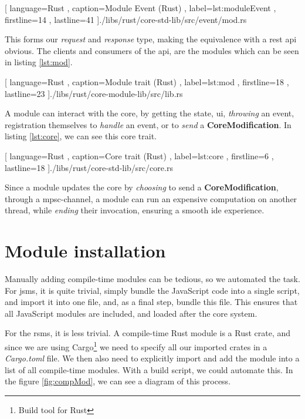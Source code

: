 \begin{center}
  
    [ language=Rust
    , caption={Module Event (Rust)}
    , label=lst:moduleEvent
    , firstline=14
    , lastline=41
    ]{./libs/rust/core-std-lib/src/event/mod.rs}
\end{center}

This forms our \textit{request} and \textit{response} type, making the
equivalence with a \gls*{rest} \gls*{api} obvious. The clients and consumers
of the \gls*{api}, are the modules which can be seen in listing \ref{lst:mod}.

\begin{center}
  
    [ language=Rust
    , caption={Module trait (Rust)}
    , label=lst:mod
    , firstline=18
    , lastline=23
    ]{./libs/rust/core-module-lib/src/lib.rs}
\end{center}

A module can interact with the core, by getting the state, \gls*{ui},
\textit{throwing} an event, registration themselves to \textit{handle} an
event, or to \textit{send} a \textbf{CoreModification}. In listing
\ref{lst:core}, we can see this core trait.

\begin{code}[H]
  
    [ language=Rust
    , caption={Core trait (Rust)}
    , label=lst:core
    , firstline=6
    , lastline=18
    ]{./libs/rust/core-std-lib/src/core.rs}
\end{code}

Since a module updates the core by \textit{choosing} to send a
\textbf{CoreModification}, through a \gls*{mpsc}-channel, a module can run an
expensive computation on another thread, while \textit{ending} their
invocation, ensuring a smooth \gls*{ide} experience.


\section{Module installation}

Manually adding compile-time modules can be tedious, so we automated the task.
For \gls*{jsms}, it is quite trivial, simply bundle the JavaScript code into a
single script, and import it into one file, and, as a final step, bundle this
file. This ensures that all JavaScript modules are included, and loaded after
the core system.

For the \gls*{rsms}, it is less trivial. A compile-time Rust module is a Rust
crate, and since we are using Cargo\footnote{Build tool for Rust} we need to
specify all our imported crates in a \textit{Cargo.toml} file. We then also
need to explicitly import and add the module into a list of all compile-time
modules. With a build script, we could automate this. In the figure
\ref{fig:compMod}, we can see a diagram of this process.


